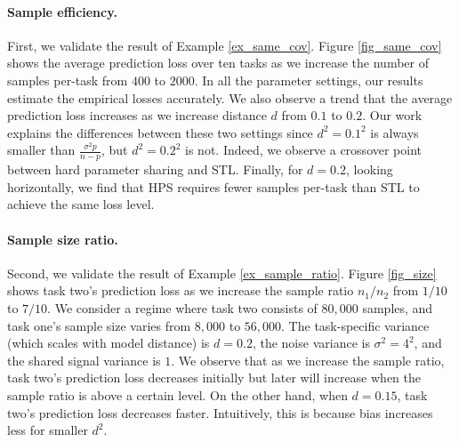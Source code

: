 \paragraph{Sample efficiency.}
First, we validate the result of Example \ref{ex_same_cov}.
Figure \ref{fig_same_cov} shows the average prediction loss over ten tasks as we increase the number of samples per-task from $400$ to $2000$.
In all the parameter settings, our results estimate the empirical losses accurately.
We also observe a trend that the average prediction loss increases as we increase distance $d$ from $0.1$ to $0.2$.
Our work explains the differences between these two settings since $d^2 = 0.1^2$ is always smaller than $\frac{\sigma^2 p}{n - p}$, but $d^2 = 0.2^2$ is not.
Indeed, we observe a crossover point between hard parameter sharing and STL.
Finally, for $d = 0.2$, looking horizontally, we find that HPS requires fewer samples per-task than STL to achieve the same loss level. %

\paragraph{Sample size ratio.}
Second, we validate the result of Example \ref{ex_sample_ratio}.
Figure \ref{fig_size} shows task two's prediction loss  as we increase the sample ratio $n_1 / n_2$ from $1/10$ to $7/10$.
We consider a regime where task two consists of $80,000$ samples, and task one's sample size varies from $8,000$ to $56,000$. 
The task-specific variance (which scales with model distance) is $d = 0.2$, the noise variance is $\sigma^2 = 4^2$, and the shared signal variance is $1$. We observe that as we increase the sample ratio, task two's prediction loss decreases initially but later will increase when the sample ratio is above a certain level.
On the other hand, when $d = 0.15$, task two's prediction loss decreases faster.
Intuitively, this is because bias increases less for smaller $d^2$.

